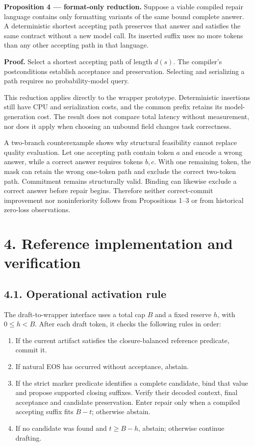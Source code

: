 \documentclass[
  12pt,
  a4paper,
]{article}
\providecommand{\tightlist}{%
  \setlength{\itemsep}{0pt}\setlength{\parskip}{0pt}}
\begin{document}
\textbf{Proposition 4 --- format-only reduction.} Suppose a viable
compiled repair language contains only formatting variants of the same
bound complete answer. A deterministic shortest accepting path preserves
that answer and satisfies the same contract without a new model call.
Its inserted suffix uses no more tokens than any other accepting path in
that language.

\textbf{Proof.} Select a shortest accepting path of length \(d(s)\). The
compiler's postconditions establish acceptance and preservation.
Selecting and serializing a path requires no probability-model query.

This reduction applies directly to the wrapper prototype. Deterministic
insertions still have CPU and serialization costs, and the common prefix
retains its model-generation cost. The result does not compare total
latency without measurement, nor does it apply when choosing an unbound
field changes task correctness.

A two-branch counterexample shows why structural feasibility cannot
replace quality evaluation. Let one accepting path contain token \(a\)
and encode a wrong answer, while a correct answer requires tokens
\(b,c\). With one remaining token, the mask can retain the wrong
one-token path and exclude the correct two-token path. Commitment
remains structurally valid. Binding can likewise exclude a correct
answer before repair begins. Therefore neither correct-commit
improvement nor noninferiority follows from Propositions 1--3 or from
historical zero-loss observations.

\section{4. Reference implementation and
verification}\label{reference-implementation-and-verification}

\subsection{4.1. Operational activation
rule}\label{operational-activation-rule}

The draft-to-wrapper interface uses a total cap \(B\) and a fixed
reserve \(h\), with \(0\le h<B\). After each draft token, it checks the
following rules in order:

\begin{enumerate}
\def\labelenumi{\arabic{enumi}.}
\tightlist
\item
  If the current artifact satisfies the closure-balanced reference
  predicate, commit it.
\item
  If natural EOS has occurred without acceptance, abstain.
\item
  If the strict marker predicate identifies a complete candidate, bind
  that value and propose supported closing suffixes. Verify their
  decoded context, final acceptance and candidate preservation. Enter
  repair only when a compiled accepting suffix fits \(B-t\); otherwise
  abstain.
\item
  If no candidate was found and \(t\ge B-h\), abstain; otherwise
  continue drafting.
\end{enumerate}
\end{document}
